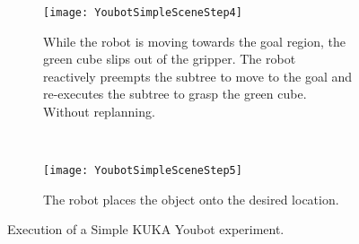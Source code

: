 {\begin{figure}[t]
        \centering
        \begin{subfigure}[b]{1\columnwidth}
                \centering
                \texttt{[image: YoubotSimpleSceneStep4]}
                \caption{While the robot is moving towards the goal region, the green cube slips out of the gripper. The robot reactively preempts the subtree to move to the goal and re-executes the subtree to grasp the green cube. Without replanning. }
                 \label{planning:SI.fig.youbotstep4}  
        \end{subfigure} 
                ~            
        \begin{subfigure}[b]{1\columnwidth}
                \centering
                \texttt{[image: YoubotSimpleSceneStep5]}
                \caption{The robot places the object onto the desired location. }
                 \label{planning:SI.fig.youbotstep5}  
        \end{subfigure} 
        \caption{Execution of a Simple KUKA Youbot experiment.}
        \label{planning:SI.fig.yousimplescreen}
\end{figure}

\vspace*{\fill}

\clearpage

}
